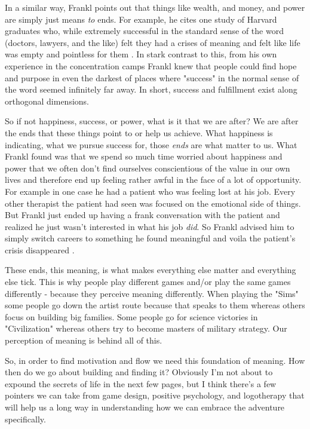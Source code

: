 \documentclass[11pt,a5paper]{book}
\begin{document}
In a similar way, Frankl points out that things like wealth, and money, and power are simply just means \textit{to} ends. For example, he cites one study of Harvard graduates who, while extremely successful in the standard sense of the word (doctors, lawyers, and the like) felt they had a crises of meaning and felt like life was empty and pointless for them \cite{frankl}. In stark contrast to this, from his own experience in the concentration camps Frankl knew that people could find hope and purpose in even the darkest of places where "success" in the normal sense of the word seemed infinitely far away. In short, success and fulfillment exist along orthogonal dimensions. 
\newline

So if not happiness, success, or power, what is it that we are after? We are after the ends that these things point to or help us achieve. What happiness is indicating, what we pursue success for, those \textit{ends} are what matter to us. What Frankl found was that we spend so much time worried about happiness and power that we often don't find ourselves conscientious of the value in our own lives and therefore end up feeling rather awful in the face of a lot of opportunity. For example in one case he had a patient who was feeling lost at his job. Every other therapist the patient had seen was focused on the emotional side of things. But Frankl just ended up having a frank conversation with the patient and realized he just wasn't interested in what his job \textit{did}. So Frankl advised him to simply switch careers to something he found meaningful and voila the patient's crisis disappeared \cite{ikigai}. 
\newline

These ends, this meaning, is what makes everything else matter and everything else tick. This is why people play different games and/or play the same games differently - because they perceive meaning differently. When playing the "Sims" some people go down the artist route because that speaks to them whereas others focus on building big families. Some people go for science victories in "Civilization" whereas others try to become masters of military strategy. Our perception of meaning is behind all of this. 
\newline

So, in order to find motivation and flow we need this foundation of meaning. How then do we go about building and finding it? Obviously I'm not about to expound the secrets of life in the next few pages, but I think there's a few pointers we can take from game design, positive psychology, and logotherapy that will help us a long way in understanding how we can embrace the adventure specifically.
\end{document}
